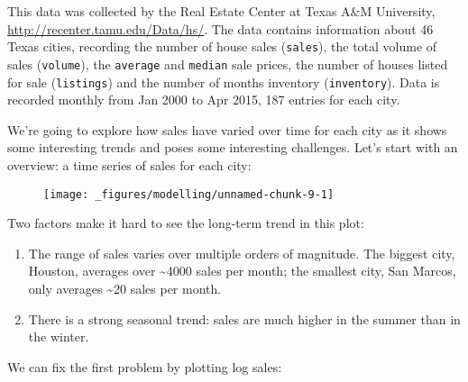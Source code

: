 This data was collected by the Real Estate Center at Texas A\&M
University, \url{http://recenter.tamu.edu/Data/hs/}. The data contains
information about 46 Texas cities, recording the number of house sales
(\texttt{sales}), the total volume of sales (\texttt{volume}), the
\texttt{average} and \texttt{median} sale prices, the number of houses
listed for sale (\texttt{listings}) and the number of months inventory
(\texttt{inventory}). Data is recorded monthly from Jan 2000 to Apr
2015, 187 entries for each city.

We're going to explore how sales have varied over time for each city as
it shows some interesting trends and poses some interesting challenges.
Let's start with an overview: a time series of sales for each city:

\begin{Shaded}
\begin{Highlighting}[]
\OperatorTok{+}\StringTok{ }
\StringTok{  }\NormalTok{(}\NormalTok{(} \OperatorTok{/}\NormalTok{)}
\end{Highlighting}
\end{Shaded}

\begin{figure}[H]
  \texttt{[image: \_figures/modelling/unnamed-chunk-9-1]}
\end{figure}

Two factors make it hard to see the long-term trend in this plot:

\begin{enumerate}
\def\labelenumi{\arabic{enumi}.}
\item
  The range of sales varies over multiple orders of magnitude. The
  biggest city, Houston, averages over \textasciitilde{}4000 sales per
  month; the smallest city, San Marcos, only averages
  \textasciitilde{}20 sales per month.
\item
  There is a strong seasonal trend: sales are much higher in the summer
  than in the winter.
\end{enumerate}

We can fix the first problem by plotting log sales:

\begin{Shaded}
\begin{Highlighting}[]
\OperatorTok{+}\StringTok{ }
\StringTok{  }\NormalTok{(}\NormalTok{(} \OperatorTok{/}\NormalTok{)}
\end{Highlighting}
\end{Shaded}

